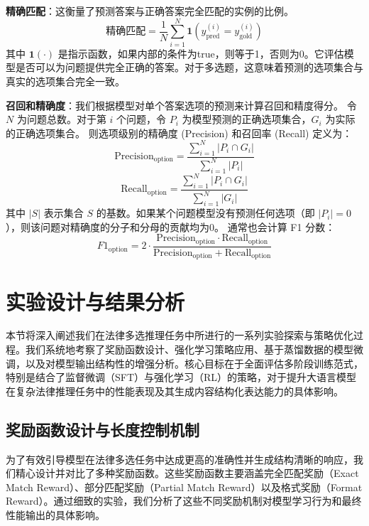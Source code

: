\documentclass{pkuthesis}
\begin{document}
\textbf{精确匹配}：这衡量了预测答案与正确答案完全匹配的实例的比例。
$$ \text{精确匹配} = \frac{1}{N} \sum_{i=1}^{N} \mathbf{1}(y^{(i)}_{\text{pred}} = y^{(i)}_{\text{gold}}) $$
其中 $\mathbf{1}(\cdot)$ 是指示函数，如果内部的条件为true，则等于1，否则为0。它评估模型是否可以为问题提供完全正确的答案。对于多选题，这意味着预测的选项集合与真实的选项集合完全一致。

\textbf{召回和精确度}：我们根据模型对单个答案选项的预测来计算召回和精度得分。
令 $N$ 为问题总数。对于第 $i$ 个问题，令 $P_i$ 为模型预测的正确选项集合，$G_i$ 为实际的正确选项集合。
则选项级别的精确度 (Precision) 和召回率 (Recall) 定义为：
$$ \text{Precision}_{\text{option}} = \frac{\sum_{i=1}^N |P_i \cap G_i|}{\sum_{i=1}^N |P_i|} $$
$$ \text{Recall}_{\text{option}} = \frac{\sum_{i=1}^N |P_i \cap G_i|}{\sum_{i=1}^N |G_i|} $$
其中 $|S|$ 表示集合 $S$ 的基数。如果某个问题模型没有预测任何选项（即 $|P_i|=0$），则该问题对精确度的分子和分母的贡献均为0。
通常也会计算 F1 分数：
$$ F1_{\text{option}} = 2 \cdot \frac{\text{Precision}_{\text{option}} \cdot \text{Recall}_{\text{option}}}{\text{Precision}_{\text{option}} + \text{Recall}_{\text{option}}} $$









\section{实验设计与结果分析}
本节将深入阐述我们在法律多选推理任务中所进行的一系列实验探索与策略优化过程。我们系统地考察了奖励函数设计、强化学习策略应用、基于蒸馏数据的模型微调，以及对模型输出结构性的增强分析。核心目标在于全面评估多阶段训练范式，特别是结合了监督微调（SFT）与强化学习（RL）的策略，对于提升大语言模型在复杂法律推理任务中的性能表现及其生成内容结构化表达能力的具体影响。

\subsection{奖励函数设计与长度控制机制}
为了有效引导模型在法律多选任务中达成更高的准确性并生成结构清晰的响应，我们精心设计并对比了多种奖励函数。这些奖励函数主要涵盖完全匹配奖励（Exact Match Reward）、部分匹配奖励（Partial Match Reward）以及格式奖励（Format Reward）。通过细致的实验，我们分析了这些不同奖励机制对模型学习行为和最终性能输出的具体影响。
\end{document}
